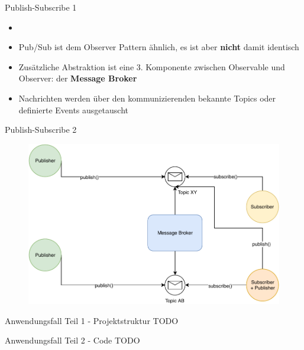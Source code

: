 \begin{frame}{Publish-Subscribe 1} %
      \begin{itemize}
        \setlength{\itemindent}{1.5in}
        \item [\textbf{Publish/Subscribe Pattern}]
    \end{itemize}

    \begin{itemize}
        \item Pub/Sub ist dem Observer Pattern ähnlich, es ist aber \textbf{nicht} damit identisch  
        \item Zusätzliche Abstraktion ist eine 3. Komponente zwischen Observable und Observer: der  \textbf{Message Broker}
        \item Nachrichten werden über den kommunizierenden bekannte Topics oder definierte Events ausgetauscht
    \end{itemize}   

\end{frame}


\begin{frame}{Publish-Subscribe 2} 
      \begin{figure}[!htb]
        \includegraphics[scale=0.67]{6-python3/img/pubsub}  
    \end{figure}

\end{frame}


\begin{frame}{Anwendungsfall Teil 1 - Projektstruktur}
    TODO
\end{frame}

\begin{frame}{Anwendungsfall Teil 2 - Code}
    TODO
\end{frame}



